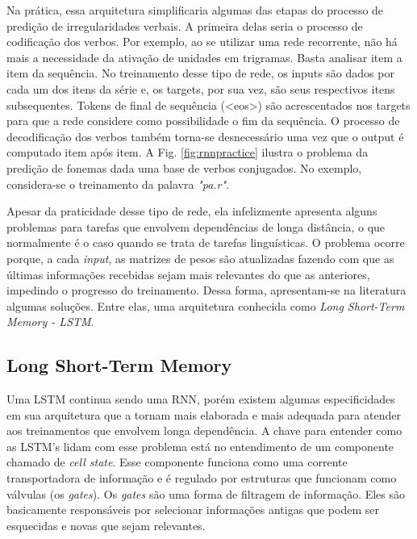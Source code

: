 Na prática, essa arquitetura simplificaria algumas das etapas do processo de predição de irregularidades verbais. A primeira delas seria o processo de codificação dos verbos. Por exemplo, ao se utilizar uma rede recorrente, não há mais a necessidade da ativação de unidades em trigramas. Basta analisar item a item da sequência. No treinamento desse tipo de rede, os inputs são dados por cada um dos itens da série e, os targets, por sua vez, são seus respectivos itens subsequentes. Tokens de final de sequência (<eos>) são acrescentados nos targets para que a rede considere como possibilidade o fim da sequência. O processo de decodificação dos verbos também torna-se desnecessário uma vez que o output é computado item após item. A Fig. \ref{fig:rnnpractice} ilustra o problema da predição de fonemas dada uma base de verbos conjugados. No exemplo, considera-se o treinamento da palavra \textit{"pa.r\textupsilon"}. 

Apesar da praticidade desse tipo de rede, ela infelizmente apresenta alguns problemas para tarefas que envolvem dependências de longa distância, o que normalmente é o caso quando se trata de tarefas linguísticas. O problema ocorre porque, a cada \textit{input}, as matrizes de pesos são atualizadas fazendo com que as últimas informações recebidas sejam mais relevantes do que as anteriores, impedindo o progresso do treinamento. Dessa forma, apresentam-se na literatura algumas soluções. Entre elas, uma arquitetura conhecida como \textit{Long Short-Term Memory - LSTM}.



\subsection{Long Short-Term Memory}
\label{sec:LSTM}

Uma LSTM continua sendo uma RNN, porém existem algumas especificidades em sua arquitetura que a tornam mais elaborada e mais adequada para atender aos treinamentos que envolvem longa dependência. A chave para entender como as LSTM's lidam com esse problema está no entendimento de um componente chamado de \textit{cell state}. Esse componente funciona como uma corrente transportadora de informação e é regulado por estruturas que funcionam como válvulas (os \textit{gates}). Os \textit{gates} são uma forma de filtragem de informação. Eles são basicamente responsáveis por selecionar informações antigas que podem ser esquecidas e novas que sejam relevantes. 

